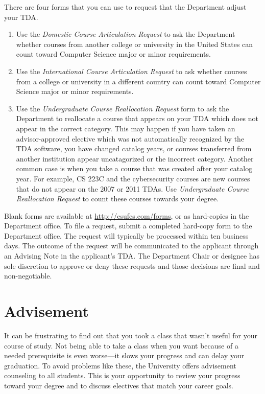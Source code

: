 \documentclass{book}
\newcommand{\shrunkurl}[1]{\url{http://csufcs.com/#1}}
\begin{document}
There are four forms that you can use to request that the Department
adjust your TDA.
\begin{enumerate}
  \item Use the \emph{Domestic Course Articulation Request} to ask the
    Department whether courses from another college or university in
    the United States can count toward Computer Science major or minor
    requirements.
  \item Use the \emph{International Course Articulation Request} to
    ask whether courses from a college or university in a different
    country can count toward Computer Science major or minor
    requirements.
  \item Use the \emph{Undergraduate Course Reallocation Request} form
    to ask the Department to reallocate a course that appears on your
    TDA which does not appear in the correct category. This may happen
    if you have taken an advisor-approved elective which was not
    automatically recognized by the TDA software, you have changed
    catalog years, or courses transferred from another institution
    appear uncatagorized or the incorrect category.  Another common
    case is when you take a course that was created after your catalog
    year. For example, CS 223C and the cybersecurity courses are new
    courses that do not appear on the 2007 or 2011 TDAs. Use
    \emph{Undergraduate Course Reallocation Request} to count these
    courses towards your degree.
\end{enumerate}

Blank forms are available at \shrunkurl{forms}, or as hard-copies in
the Department office. To file a request, submit a completed hard-copy
form to the Department office. The request will typically be processed
within ten business days. The outcome of the request will be
communicated to the applicant through an Advising Note in the
applicant’s TDA. The Department Chair or designee has sole discretion
to approve or deny these requests and those decisions are final and
non-negotiable.

\chapter{Advisement}

It can be frustrating to find out that you took a class that wasn't
useful for your course of study. Not being able to take a class when
you want because of a needed prerequisite is even worse---it slows
your progress and can delay your graduation. To avoid problems like
these, the University offers advisement counseling to all
students. This is your opportunity to review your progress toward your
degree and to discuss electives that match your career goals.
\end{document}
